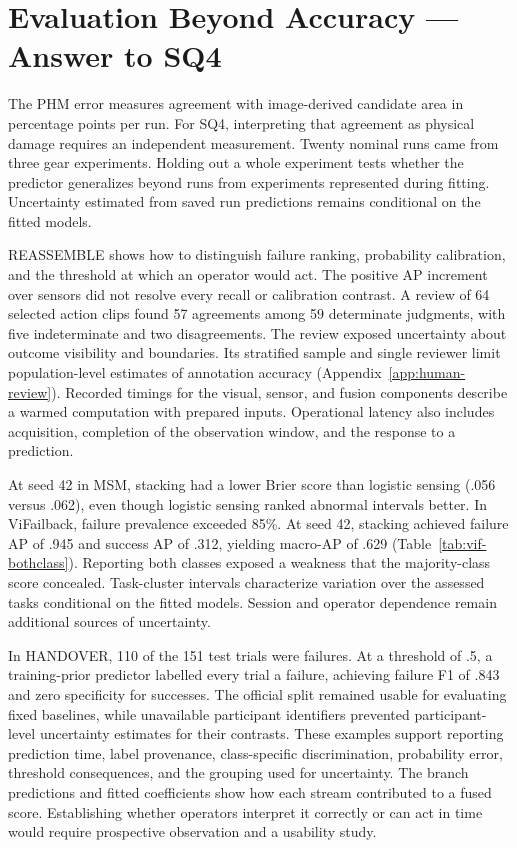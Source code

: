 \section{Evaluation Beyond Accuracy --- Answer to SQ4}
The PHM error measures agreement with image-derived candidate area in percentage points per run. For SQ4, interpreting that agreement as physical damage requires an independent measurement. Twenty nominal runs came from three gear experiments. Holding out a whole experiment tests whether the predictor generalizes beyond runs from experiments represented during fitting. Uncertainty estimated from saved run predictions remains conditional on the fitted models.

REASSEMBLE shows how to distinguish failure ranking, probability calibration, and the threshold at which an operator would act. The positive AP increment over sensors did not resolve every recall or calibration contrast. A review of 64 selected action clips found 57 agreements among 59 determinate judgments, with five indeterminate and two disagreements. The review exposed uncertainty about outcome visibility and boundaries. Its stratified sample and single reviewer limit population-level estimates of annotation accuracy (Appendix~\ref{app:human-review}). Recorded timings for the visual, sensor, and fusion components describe a warmed computation with prepared inputs. Operational latency also includes acquisition, completion of the observation window, and the response to a prediction.

At seed 42 in MSM, stacking had a lower Brier score than logistic sensing (.056 versus .062), even though logistic sensing ranked abnormal intervals better. In ViFailback, failure prevalence exceeded 85\%. At seed 42, stacking achieved failure AP of .945 and success AP of .312, yielding macro-AP of .629 (Table~\ref{tab:vif-bothclass}). Reporting both classes exposed a weakness that the majority-class score concealed. Task-cluster intervals characterize variation over the assessed tasks conditional on the fitted models. Session and operator dependence remain additional sources of uncertainty.

In HANDOVER, 110 of the 151 test trials were failures. At a threshold of .5, a training-prior predictor labelled every trial a failure, achieving failure F1 of .843 and zero specificity for successes. The official split remained usable for evaluating fixed baselines, while unavailable participant identifiers prevented participant-level uncertainty estimates for their contrasts. These examples support reporting prediction time, label provenance, class-specific discrimination, probability error, threshold consequences, and the grouping used for uncertainty. The branch predictions and fitted coefficients show how each stream contributed to a fused score. Establishing whether operators interpret it correctly or can act in time would require prospective observation and a usability study.

